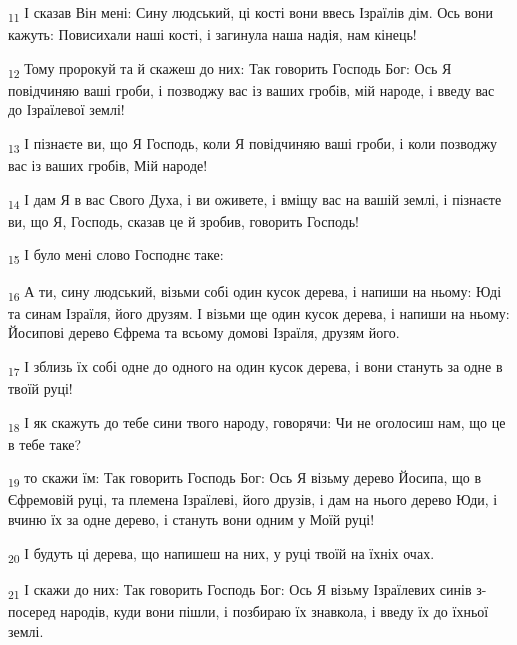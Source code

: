 \begin{tcolorbox}
\textsubscript{11} І сказав Він мені: Сину людський, ці кості вони ввесь Ізраїлів дім. Ось вони кажуть: Повисихали наші кості, і загинула наша надія, нам кінець!
\end{tcolorbox}
\begin{tcolorbox}
\textsubscript{12} Тому пророкуй та й скажеш до них: Так говорить Господь Бог: Ось Я повідчиняю ваші гроби, і позводжу вас із ваших гробів, мій народе, і введу вас до Ізраїлевої землі!
\end{tcolorbox}
\begin{tcolorbox}
\textsubscript{13} І пізнаєте ви, що Я Господь, коли Я повідчиняю ваші гроби, і коли позводжу вас із ваших гробів, Мій народе!
\end{tcolorbox}
\begin{tcolorbox}
\textsubscript{14} І дам Я в вас Свого Духа, і ви оживете, і вміщу вас на вашій землі, і пізнаєте ви, що Я, Господь, сказав це й зробив, говорить Господь!
\end{tcolorbox}
\begin{tcolorbox}
\textsubscript{15} І було мені слово Господнє таке:
\end{tcolorbox}
\begin{tcolorbox}
\textsubscript{16} А ти, сину людський, візьми собі один кусок дерева, і напиши на ньому: Юді та синам Ізраїля, його друзям. І візьми ще один кусок дерева, і напиши на ньому: Йосипові дерево Єфрема та всьому домові Ізраїля, друзям його.
\end{tcolorbox}
\begin{tcolorbox}
\textsubscript{17} І зблизь їх собі одне до одного на один кусок дерева, і вони стануть за одне в твоїй руці!
\end{tcolorbox}
\begin{tcolorbox}
\textsubscript{18} І як скажуть до тебе сини твого народу, говорячи: Чи не оголосиш нам, що це в тебе таке?
\end{tcolorbox}
\begin{tcolorbox}
\textsubscript{19} то скажи їм: Так говорить Господь Бог: Ось Я візьму дерево Йосипа, що в Єфремовій руці, та племена Ізраїлеві, його друзів, і дам на нього дерево Юди, і вчиню їх за одне дерево, і стануть вони одним у Моїй руці!
\end{tcolorbox}
\begin{tcolorbox}
\textsubscript{20} І будуть ці дерева, що напишеш на них, у руці твоїй на їхніх очах.
\end{tcolorbox}
\begin{tcolorbox}
\textsubscript{21} І скажи до них: Так говорить Господь Бог: Ось Я візьму Ізраїлевих синів з-посеред народів, куди вони пішли, і позбираю їх знавкола, і введу їх до їхньої землі.
\end{tcolorbox}
